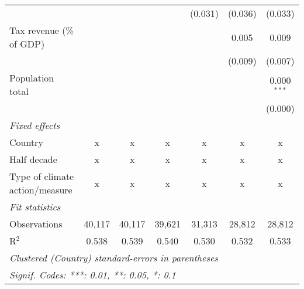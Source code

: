 \begin{tabular}{lcccccc}
                                                       &         &               &               & (0.031)       & (0.036)       & (0.033)\\   
   Tax revenue (\% of GDP)                             &         &               &               &               & 0.005         & 0.009\\   
                                                       &         &               &               &               & (0.009)       & (0.007)\\   
   Population total                                    &         &               &               &               &               & 0.000$^{***}$\\   
                                                       &         &               &               &               &               & (0.000)\\   
   \emph{Fixed effects}\\
   Country                                             & x       & x             & x             & x             & x             & x\\  
   Half decade                                         & x       & x             & x             & x             & x             & x\\  
   Type of climate action/measure                      & x       & x             & x             & x             & x             & x\\  
   \midrule \emph{Fit statistics}\\
   Observations                                        & 40,117  & 40,117        & 39,621        & 31,313        & 28,812        & 28,812\\  
   R$^2$                                               & 0.538   & 0.539         & 0.540         & 0.530         & 0.532         & 0.533\\  
   \midrule
   \multicolumn{7}{l}{\emph{Clustered (Country) standard-errors in parentheses}}\\
   \multicolumn{7}{l}{\emph{Signif. Codes: ***: 0.01, **: 0.05, *: 0.1}}\\
\end{tabular}
\par\endgroup


